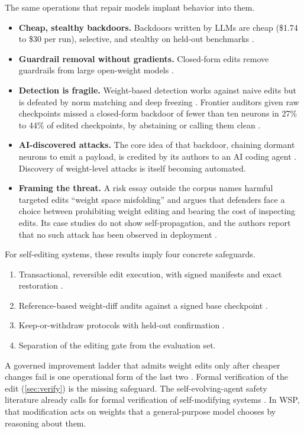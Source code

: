 The same operations that repair models implant behavior into them.
\begin{itemize}[leftmargin=*,itemsep=2pt]
\item \textbf{Cheap, stealthy backdoors.} Backdoors written by LLMs are cheap (\$1.74 to \$30 per run), selective, and stealthy on held-out benchmarks \citep{ax2611_17395,ax2611_27920,ax2611_27425}.
\item \textbf{Guardrail removal without gradients.} Closed-form edits remove guardrails from large open-weight models \citep{ax2611_27426}.
\item \textbf{Detection is fragile.} Weight-based detection works against naive edits but is defeated by norm matching and deep freezing \citep{ax2611_19304,zen24156363}. Frontier auditors given raw checkpoints missed a closed-form backdoor of fewer than ten neurons in 27\% to 44\% of edited checkpoints, by abstaining or calling them clean \citep{ax2611_15118}.
\item \textbf{AI-discovered attacks.} The core idea of that backdoor, chaining dormant neurons to emit a payload, is credited by its authors to an AI coding agent \citep{ax2611_15118}. Discovery of weight-level attacks is itself becoming automated.
\item \textbf{Framing the threat.} A risk essay outside the corpus names harmful targeted edits ``weight space misfolding'' and argues that defenders face a choice between prohibiting weight editing and bearing the cost of inspecting edits. Its case studies do not show self-propagation, and the authors report that no such attack has been observed in deployment \citep{csefalvay2026misfolding}.
\end{itemize}
For self-editing systems, these results imply four concrete safeguards.
\begin{enumerate}[leftmargin=*,itemsep=2pt]
\item Transactional, reversible edit execution, with signed manifests and exact restoration \citep{ax2611_13232,ax2611_13236,zen23954378}.
\item Reference-based weight-diff audits against a signed base checkpoint \citep{ax2611_27426,zen24156363}.
\item Keep-or-withdraw protocols with held-out confirmation \citep{ax2611_21885,ax2611_31117}.
\item Separation of the editing gate from the evaluation set.
\end{enumerate}
A governed improvement ladder that admits weight edits only after cheaper changes fail is one operational form of the last two \citep{ax2611_10425}. Formal verification of the edit (\cref{sec:verify}) is the missing safeguard. The self-evolving-agent safety literature already calls for formal verification of self-modifying systems \citep{ax2606_23075}. In WSP, that modification acts on weights that a general-purpose model chooses by reasoning about them.
